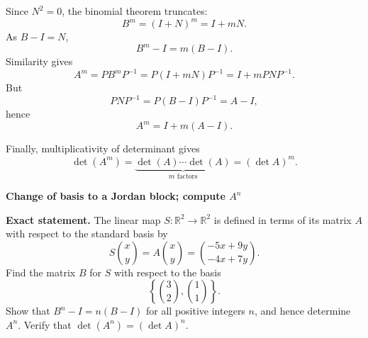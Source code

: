 \begin{solution}
Since \(N^2=0\), the binomial theorem truncates:
\[
B^m=(I+N)^m=I+mN.
\]
As \(B-I=N\),
\[
B^m-I=m(B-I).
\]
Similarity gives
\[
A^m=PB^mP^{-1}
=P(I+mN)P^{-1}
=I+mPNP^{-1}.
\]
But
\[
PNP^{-1}=P(B-I)P^{-1}=A-I,
\]
hence
\[
A^m=I+m(A-I).
\]

Finally, multiplicativity of determinant gives
\[
\det(A^m)=\underbrace{\det(A)\cdots\det(A)}_{m\text{ factors}}
=(\det A)^m.
\]
\end{solution}

\begin{problem}[CP-I-0091]
\label{prob:cp-i-0091}
\textbf{Change of basis to a Jordan block; compute $A^n$}

\textbf{Exact statement.}
\hspace*{1.5em}The linear map $S:\mathbb R^2\to\mathbb R^2$ is defined in terms of its matrix $A$ with respect to the standard basis by
\[
S\binom{x}{y}=A\binom{x}{y}=\binom{-5x+9y}{-4x+7y}.
\]
Find the matrix $B$ for $S$ with respect to the basis
\[
\left\{\binom{3}{2},\binom{1}{1}\right\}.
\]
Show that $B^n-I = n(B-I)$ for all positive integers $n$, and hence determine $A^n$.
Verify that $\det(A^n)=(\det A)^n$.

\end{problem}


